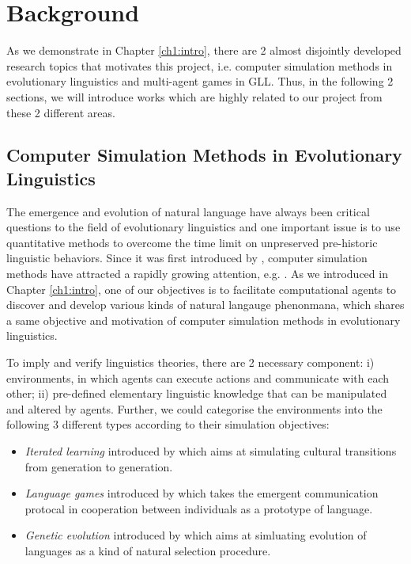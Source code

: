 \chapter{Background}
\label{ch2:background}

As we demonstrate in Chapter \ref{ch1:intro}, there are 2 almost disjointly developed research topics that motivates this project, i.e. computer simulation methods in evolutionary linguistics and multi-agent games in GLL. Thus, in the following 2 sections, we will introduce works which are highly related to our project from these 2 different areas.

\section{Computer Simulation Methods in Evolutionary Linguistics}
\label{sec2.1:evolang}

The emergence and evolution of natural language have always been critical questions to the field of evolutionary linguistics \cite{macwhinney2013emergence} and one important issue is to use quantitative methods to overcome the time limit on unpreserved pre-historic linguistic behaviors\cite{lieberman2006toward, evans2009myth}. Since it was first introduced by \cite{hurford1989biological}, computer simulation methods have attracted a rapidly growing attention, e.g. \cite{hurford1998approaches, knight2000evolutionary, briscoe2002book, christiansen2003language, bickerton2009biological, cangelosi2012simulating}. As we introduced in Chapter \ref{ch1:intro}, one of our objectives is to facilitate computational agents to discover and develop various kinds of natural langauge phenonmana, which shares a same objective and motivation of computer simulation methods in evolutionary linguistics.

To imply and verify linguistics theories, there are 2 necessary component: i) environments, in which agents can execute actions and communicate with each other; ii) pre-defined elementary linguistic knowledge that can be manipulated and altered by agents. Further, we could categorise the environments into the following 3 different types according to their simulation objectives:
\begin{itemize}
  \item \textit{Iterated learning} introduced by \cite{kirby1999function} which aims at simulating cultural transitions from generation to generation.
  \item \textit{Language games} introduced by \cite{wittgenstein2009philosophical} which takes the emergent communication protocal in cooperation between individuals as a prototype of language.
  \item \textit{Genetic evolution} introduced by \cite{briscoe1998language} which aims at simluating evolution of languages as a kind of natural selection procedure\cite{darwin1859origin}.
\end{itemize}

